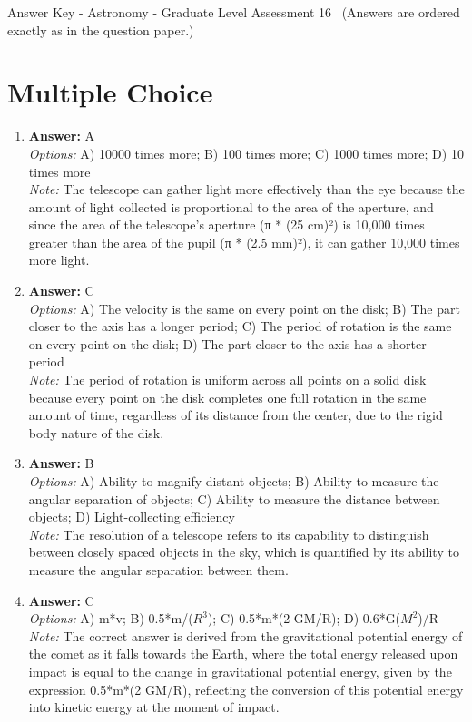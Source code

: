 \documentclass[12pt]{article}
\begin{document}
\begin{center}
Answer Key - Astronomy - Graduate Level Assessment 16 \
\small (Answers are ordered exactly as in the question paper.)
\end{center}

\section*{Multiple Choice}
\begin{enumerate}[label=\arabic*.]
\item \textbf{Answer:} A
\\ \textit{Options:} A) 10000 times more; B) 100 times more; C) 1000 times more; D) 10 times more
\\ \textit{Note:} The telescope can gather light more effectively than the eye because the amount of light collected is proportional to the area of the aperture, and since the area of the telescope's aperture (π * (25 cm)²) is 10,000 times greater than the area of the pupil (π * (2.5 mm)²), it can gather 10,000 times more light.
\item \textbf{Answer:} C
\\ \textit{Options:} A) The velocity is the same on every point on the disk; B) The part closer to the axis has a longer period; C) The period of rotation is the same on every point on the disk; D) The part closer to the axis has a shorter period
\\ \textit{Note:} The period of rotation is uniform across all points on a solid disk because every point on the disk completes one full rotation in the same amount of time, regardless of its distance from the center, due to the rigid body nature of the disk.
\item \textbf{Answer:} B
\\ \textit{Options:} A) Ability to magnify distant objects; B) Ability to measure the angular separation of objects; C) Ability to measure the distance between objects; D) Light-collecting efficiency
\\ \textit{Note:} The resolution of a telescope refers to its capability to distinguish between closely spaced objects in the sky, which is quantified by its ability to measure the angular separation between them.
\item \textbf{Answer:} C
\\ \textit{Options:} A) m*v; B) 0.5*m/($R^3$); C) 0.5*m*(2 GM/R); D) 0.6*G($M^2$)/R
\\ \textit{Note:} The correct answer is derived from the gravitational potential energy of the comet as it falls towards the Earth, where the total energy released upon impact is equal to the change in gravitational potential energy, given by the expression 0.5*m*(2 GM/R), reflecting the conversion of this potential energy into kinetic energy at the moment of impact.

\end{enumerate}
\end{document}
